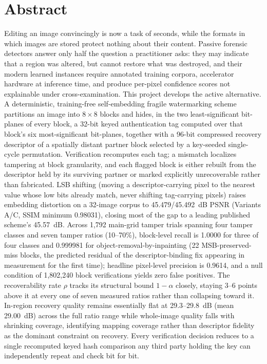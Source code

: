 \documentclass[12pt,a4paper]{article}
\begin{document}
\newpage

\section*{Abstract}

Editing an image convincingly is now a task of seconds, while the formats in
which images are stored protect nothing about their content. Passive forensic
detectors answer only half the question a practitioner asks: they may
indicate that a region was altered, but cannot restore what was destroyed,
and their modern learned instances require annotated training corpora,
accelerator hardware at inference time, and produce per-pixel confidence
scores not explainable under cross-examination. This project develops the
active alternative. A deterministic, training-free self-embedding fragile
watermarking scheme partitions an image into $8 \times 8$ blocks and hides, in
the two least-significant bit-planes of every block, a 32-bit keyed
authentication tag computed over that block's six most-significant bit-planes,
together with a 96-bit compressed recovery descriptor of a spatially distant
partner block selected by a key-seeded single-cycle permutation. Verification
recomputes each tag; a mismatch localizes tampering at block granularity, and
each flagged block is either rebuilt from the descriptor held by its
surviving partner or marked explicitly unrecoverable rather than fabricated.
LSB shifting (moving a descriptor-carrying pixel to the nearest value whose
low bits already match, never shifting tag-carrying pixels) raises embedding
distortion on a 32-image corpus to 45.479/45.492~dB PSNR (Variants A/C, SSIM
minimum 0.98031), closing most of the gap to a leading published scheme's
45.57~dB. Across 1{,}792 main-grid tamper trials spanning four tamper classes
and seven tamper ratios (10--70\%), block-level recall is 1.0000 for three of
four classes and 0.999981 for object-removal-by-inpainting (22
MSB-preserved-miss blocks, the predicted residual of the descriptor-binding
fix appearing in measurement for the first time); headline pixel-level
precision is 0.9614, and a null condition of 1{,}802{,}240 block verifications
yields zero false positives. The recoverability rate $\rho$ tracks its
structural bound $1-\alpha$ closely, staying 3--6 points above it at every one
of seven measured ratios rather than collapsing toward it. In-region recovery
quality remains essentially flat at 29.3--29.8~dB (mean 29.00~dB) across the
full ratio range while whole-image quality falls with shrinking coverage,
identifying mapping coverage rather than descriptor fidelity as the dominant
constraint on recovery. Every verification decision reduces to a single
recomputed keyed hash comparison any third party holding the key can
independently repeat and check bit for bit.
\end{document}
